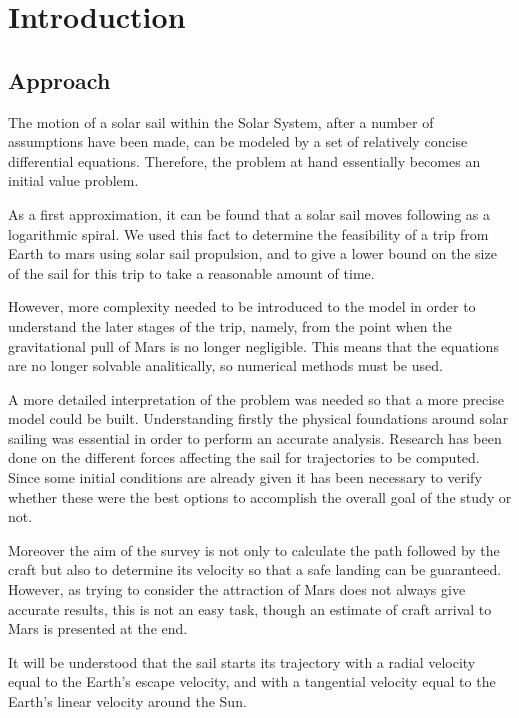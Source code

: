 \documentclass[twocolumn,12pt,a4paper]{article}
\numberwithin{equation}{section}
\begin{document}
\begin{titlingpage}
\tableofcontents
\end{titlingpage}

\section{Introduction}

\subsection{Approach}
The motion of a solar sail within the Solar System, after a number of assumptions have been made, can be modeled by a set of relatively concise differential equations. Therefore, the problem at hand essentially becomes an initial value problem. 

As a first approximation, it can be found that a solar sail moves following as a logarithmic spiral. We used this fact to determine the feasibility of a trip from Earth to mars using solar sail propulsion, and to give a lower bound on the size of the sail for this trip to take a reasonable amount of time.

However, more complexity needed to be introduced to the model in order to understand the later stages of the trip, namely, from the point when the gravitational pull of Mars is no longer negligible. This means that the equations are no longer solvable analitically, so numerical methods must be used.

 A more detailed interpretation of the problem was needed so that a more precise model could be built. Understanding firstly the physical foundations around solar sailing was essential in order to perform an accurate analysis. Research has been done on the different forces affecting the sail for trajectories to be computed. Since some initial conditions are already given it has been necessary to verify whether these were the best options to accomplish the overall goal of the study or not.
 
  Moreover the aim of the survey is not only to calculate the path followed by the craft but also to determine its velocity so that a safe landing can be guaranteed. However, as trying to consider the attraction of Mars does not always give accurate results, this is not an easy task, though an estimate of craft arrival to Mars is presented at the end.
 
 It will be understood that the sail starts its trajectory with a radial velocity equal to the Earth's escape velocity, and with a tangential velocity equal to the Earth's linear velocity around the Sun. 
 
\end{document}
